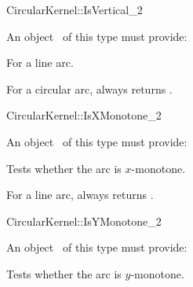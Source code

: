 \begin{ccRefFunctionObjectConcept}{CircularKernel::IsVertical_2}


\ccRefines


An object \ccVar\ of this type must provide:

{For a line arc.}

{For a circular arc,  always returns .}

\ccHasModels


\ccSeeAlso


\end{ccRefFunctionObjectConcept}

\begin{ccRefFunctionObjectConcept}{CircularKernel::IsXMonotone_2}


An object \ccVar\ of this type must provide:

{Tests whether the arc is $x$-monotone.}

{For a line arc, always returns .}

\ccHasModels


\ccSeeAlso


\end{ccRefFunctionObjectConcept}

\begin{ccRefFunctionObjectConcept}{CircularKernel::IsYMonotone_2}


An object \ccVar\ of this type must provide:

{Tests whether the arc is $y$-monotone.}

\ccHasModels


\ccSeeAlso


\end{ccRefFunctionObjectConcept}
